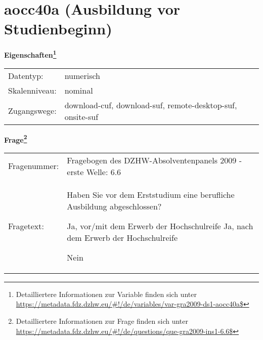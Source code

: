 
    \setcounter{footnote}{0}

    \vspace*{-1.8cm}
	\section{aocc40a (Ausbildung vor Studienbeginn)}
	\label{section:aocc40a}



    \vspace*{0.5cm}
    \noindent\textbf{Eigenschaften\footnote{Detailliertere Informationen zur Variable finden sich unter
		\url{https://metadata.fdz.dzhw.eu/\#!/de/variables/var-gra2009-ds1-aocc40a$}}}\\
	\begin{tabularx}{\hsize}{@{}lX}
	Datentyp: & numerisch \\
	Skalenniveau: & nominal \\
	Zugangswege: &
	  download-cuf, 
	  download-suf, 
	  remote-desktop-suf, 
	  onsite-suf
 \\
    \end{tabularx}



				\vspace*{0.5cm}
                \noindent\textbf{Frage\footnote{Detailliertere Informationen zur Frage finden sich unter
		              \url{https://metadata.fdz.dzhw.eu/\#!/de/questions/que-gra2009-ins1-6.6$}}}\\
				\begin{tabularx}{\hsize}{@{}lX}
					Fragenummer: &
					  Fragebogen des DZHW-Absolventenpanels 2009 - erste Welle:
					  6.6
 \\
					Fragetext: & Haben Sie vor dem Erststudium eine berufliche Ausbildung abgeschlossen?\par  Ja, vor/mit dem Erwerb der Hochschulreife Ja, nach dem Erwerb der Hochschulreife\par  Nein \\
				\end{tabularx}





